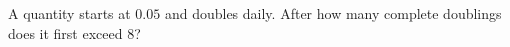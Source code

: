 A quantity starts at $0.05$ and doubles daily. After how many complete doublings does it first exceed $8$?
